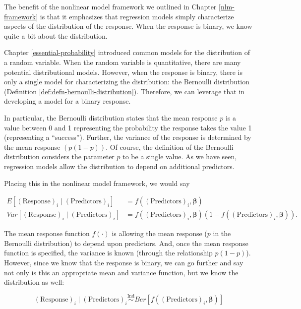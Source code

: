 \documentclass[
]{book}
\theoremstyle{plain}
\theoremstyle{mydefn}
\theoremstyle{myexmpl}
\theoremstyle{remark}
\begin{document}
The benefit of the nonlinear model framework we outlined in Chapter \ref{nlm-framework} is that it emphasizes that regression models simply characterize aspects of the distribution of the response. When the response is binary, we know quite a bit about the distribution.

Chapter \ref{essential-probability} introduced common models for the distribution of a random variable. When the random variable is quantitative, there are many potential distributional models. However, when the response is binary, there is only a single model for characterizing the distribution: the Bernoulli distribution (Definition \ref{def:defn-bernoulli-distribution}). Therefore, we can leverage that in developing a model for a binary response.

In particular, the Bernoulli distribution states that the mean response \(p\) is a value between 0 and 1 representing the probability the response takes the value 1 (representing a ``success''). Further, the variance of the response is determined by the mean response \((p (1 - p))\). Of course, the definition of the Bernoulli distribution considers the parameter \(p\) to be a single value. As we have seen, regression models allow the distribution to depend on additional predictors.

Placing this in the nonlinear model framework, we would say

\[
\begin{aligned}
  E\left[(\text{Response})_i \mid (\text{Predictors})_i\right] 
    &= f\left((\text{Predictors})_i, \boldsymbol{\beta}\right) \\
  Var\left[(\text{Response})_i \mid (\text{Predictors})_i\right]
    &= f\left((\text{Predictors})_i, \boldsymbol{\beta}\right) \left(1 - f\left((\text{Predictors})_i, \boldsymbol{\beta}\right)\right).
\end{aligned}
\]

The mean response function \(f(\cdot)\) is allowing the mean response (\(p\) in the Bernoulli distribution) to depend upon predictors. And, once the mean response function is specified, the variance is known (through the relationship \(p (1 - p)\)). However, since we know that the response is binary, we can go further and say not only is this an appropriate mean and variance function, but we know the distribution as well:

\[(\text{Response})_i \mid (\text{Predictors})_i \stackrel{\text{Ind}}{\sim}Ber\left[f\left((\text{Predictors})_i, \boldsymbol{\beta}\right)\right]\]
\end{document}
